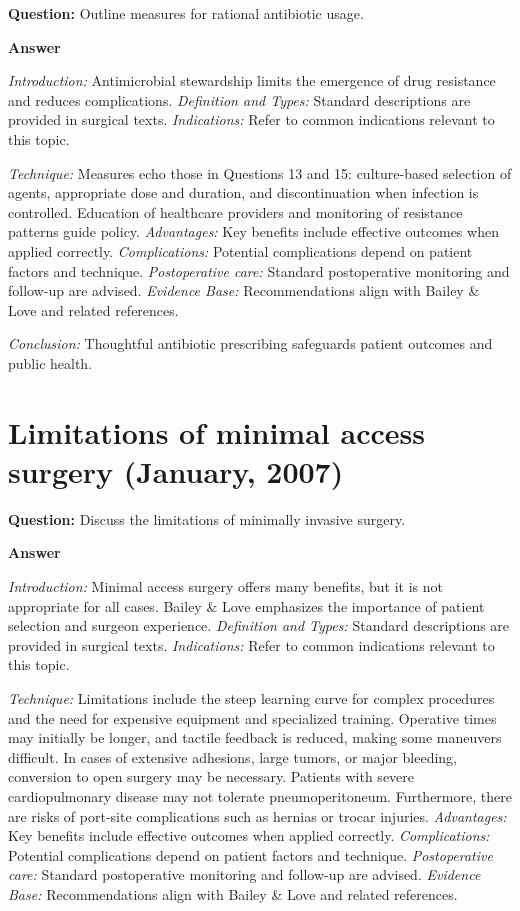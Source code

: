 \documentclass{article}
\begin{document}
\textbf{Question:} Outline measures for rational antibiotic usage.

\textbf{Answer}

\emph{Introduction:} Antimicrobial stewardship limits the emergence of drug resistance and reduces complications.
\emph{Definition and Types:} Standard descriptions are provided in surgical texts.
\emph{Indications:} Refer to common indications relevant to this topic.

\emph{Technique:} Measures echo those in Questions 13 and 15: culture-based selection of agents, appropriate dose and duration, and discontinuation when infection is controlled. Education of healthcare providers and monitoring of resistance patterns guide policy.
\emph{Advantages:} Key benefits include effective outcomes when applied correctly.
\emph{Complications:} Potential complications depend on patient factors and technique.
\emph{Postoperative care:} Standard postoperative monitoring and follow-up are advised.
\emph{Evidence Base:} Recommendations align with Bailey & Love and related references.

\emph{Conclusion:} Thoughtful antibiotic prescribing safeguards patient outcomes and public health.


\section{Limitations of minimal access surgery (January, 2007)}

\textbf{Question:} Discuss the limitations of minimally invasive surgery.

\textbf{Answer}

\emph{Introduction:} Minimal access surgery offers many benefits, but it is not appropriate for all cases. Bailey & Love emphasizes the importance of patient selection and surgeon experience.
\emph{Definition and Types:} Standard descriptions are provided in surgical texts.
\emph{Indications:} Refer to common indications relevant to this topic.

\emph{Technique:} Limitations include the steep learning curve for complex procedures and the need for expensive equipment and specialized training. Operative times may initially be longer, and tactile feedback is reduced, making some maneuvers difficult. In cases of extensive adhesions, large tumors, or major bleeding, conversion to open surgery may be necessary. Patients with severe cardiopulmonary disease may not tolerate pneumoperitoneum. Furthermore, there are risks of port-site complications such as hernias or trocar injuries.
\emph{Advantages:} Key benefits include effective outcomes when applied correctly.
\emph{Complications:} Potential complications depend on patient factors and technique.
\emph{Postoperative care:} Standard postoperative monitoring and follow-up are advised.
\emph{Evidence Base:} Recommendations align with Bailey & Love and related references.
\end{document}
